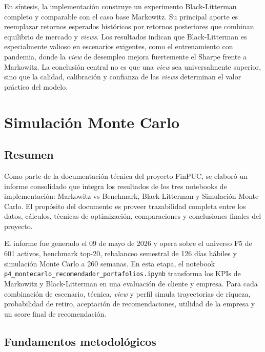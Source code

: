 En s\'intesis, la implementaci\'on construye un experimento Black-Litterman
completo y comparable con el caso base Markowitz. Su principal aporte es
reemplazar retornos esperados hist\'oricos por retornos posteriores que combinan
equilibrio de mercado y \textit{views}. Los resultados indican que
Black-Litterman es especialmente valioso en escenarios exigentes, como el
entrenamiento con pandemia, donde la \textit{view} de desempleo mejora
fuertemente el Sharpe frente a Markowitz. La conclusi\'on central no es que una
\textit{view} sea universalmente superior, sino que la calidad, calibraci\'on y
confianza de las \textit{views} determinan el valor pr\'actico del modelo.

\clearpage

\section*{Simulaci\'on Monte Carlo}

\subsection*{Resumen}

Como parte de la documentaci\'on t\'ecnica del proyecto FinPUC, se elabor\'o un
informe consolidado que integra los resultados de los tres notebooks de
implementaci\'on: Markowitz vs Benchmark, Black-Litterman y Simulaci\'on Monte
Carlo. El prop\'osito del documento es proveer trazabilidad completa entre los
datos, c\'alculos, t\'ecnicas de optimizaci\'on, comparaciones y conclusiones
finales del proyecto.

El informe fue generado el 09 de mayo de 2026 y opera sobre el universo F5 de
601 activos, benchmark top-20, rebalanceo semestral de 126 d\'ias h\'abiles y
simulaci\'on Monte Carlo a 260 semanas. En esta etapa, el notebook
\texttt{p4\_montecarlo\_recomendador\_portafolios.ipynb} transforma los KPIs de
Markowitz y Black-Litterman en una evaluaci\'on de cliente y empresa. Para cada combinaci\'on de escenario, t\'ecnica, \textit{view} y perfil
simula trayectorias de riqueza, probabilidad de retiro, aceptaci\'on de
recomendaciones, utilidad de la empresa y un score final de recomendaci\'on.

\subsection*{Fundamentos metodol\'ogicos}


